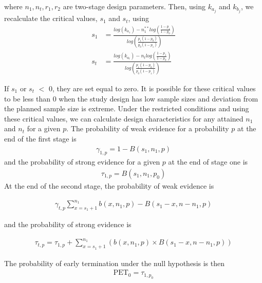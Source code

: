 \documentclass[12pt]{report}\usepackage[]{graphicx}\usepackage[]{color}
\newlength{\li}\setlength{\li}{14.48pt}
\newlength{\di}\setlength{\di}{-3.5mm}
\begin{document}
where $n_1, n_t, r_1, r_2$ are two-stage design parameters. Then, using $k_{a_j}$ and $k_{b_j}$, we recalculate the critical values, $s_1$ and $s_t$, using
\begin{equation}
\begin{aligned}
s_1 &= \frac{log(k_{a_1}) - n_1^{\ast\ast} log(\frac{1-p_1}{1-p_0})}{log(\frac{p_1(1-p_0)}{p_0(1-p_1)})} \\
s_t &= \frac{log(k_{a_t}) - n_t log(\frac{1-p_1}{1-p_0})}{log(\frac{p_1(1-p_0)}{p_0(1-p_1)})}
\end{aligned}
\end{equation}

If $s_1$ or $s_t$ $<$ 0, they are set equal to zero. It is possible for these critical values to be less than 0 when the study design has low sample sizes and deviation from the planned sample size is extreme. Under the restricted conditions and using these critical values, we can calculate design characteristics for any attained $n_1$ and $n_t$ for a given $p$. The probability of weak evidence for a probability $p$ at the end of the first stage is 
\begin{equation}
\begin{aligned}
\gamma_{1,p} = 1 - B(s_1, n_1, p)
\end{aligned}
\end{equation}
and the probability of strong evidence for a given $p$ at the end of stage one is 
\begin{equation}
\begin{aligned}
\tau_{1,p} = B(s_1, n_1, p_0)
\end{aligned}
\end{equation}
At the end of the second stage, the probability of weak evidence is 

\begin{equation}
\begin{aligned}
\gamma_{t,p} \sum_{x=s_1+1}^{n_1} b(x, n_1, p) - B(s_1 - x, n - n_1, p)
\end{aligned}
\end{equation}

and the probability of strong evidence is 

\begin{equation}
\begin{aligned}
\tau_{t,p} = \tau_{1,p} + \sum_{x=s_1+1}^{n_1} \left( b(x,n_1,p) \times B(s_1 - x, n-n_1, p) \right)
\end{aligned}
\end{equation}

The probability of early termination under the null hypothesis is then 
\begin{equation}
\begin{aligned}
\mbox{PET}_0 = \tau_{1,p_0}
\end{aligned}
\end{equation}
\end{document}
